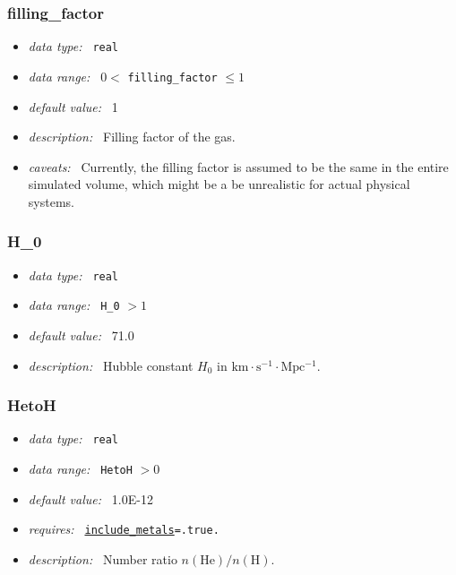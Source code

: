 \documentclass[a4paper,10pt]{article}
\begin{document}
\subsubsection{filling\_factor}
\label{opt:fillingfactor}
\begin{itemize}
 \item \textit{data type:~} \texttt{real}
 \item \textit{data range:~} $0 < $ \texttt{filling\_factor} $\leq 1$
 \item \textit{default value:~} 1
 \item \textit{description:~} Filling factor of the gas.
 \item \textit{caveats:~} Currently, the filling factor is assumed to be 
  the same in the entire simulated volume, which might be a be unrealistic for  
  actual physical systems.
\end{itemize}


\subsubsection{H\_0}
\label{opt:h0}
\begin{itemize}
 \item \textit{data type:~} \texttt{real}
 \item \textit{data range:~} \texttt{H\_0} $> 1$
 \item \textit{default value:~} 71.0
 \item \textit{description:~} Hubble constant $H_0$ in $\mathrm{km \cdot s^{-1} 	
  \cdot Mpc^{-1}}$. 
\end{itemize}

\subsubsection{HetoH}
\label{opt:hetoh}
\begin{itemize}
 \item \textit{data type:~} \texttt{real}
 \item \textit{data range:~}  \texttt{HetoH} $> 0$
 \item \textit{default value:~} 1.0E-12
 \item \textit{requires:~} \texttt{\hyperref[opt:abundreltoh]{include\_metals}=.true.}
 \item \textit{description:~} Number ratio $n(\mathrm{He})/n(\mathrm{H})$.
\end{itemize}
\end{document}
